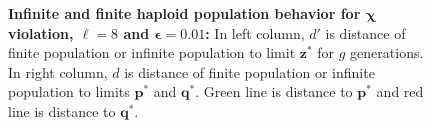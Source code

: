 \begin{figure}[ht]
\begin{center}
\hspace{-3em}%
\vspace{-0.5em} \hspace{-3em}%


\caption[\textbf{Infinite and finite haploid population behavior for $\bm{\chi}$ violation, $\ell = 8$ and $\bm{\epsilon} = 0.01$}]
{\textbf{Infinite and finite haploid population behavior for $\bm{\chi}$ violation, $\ell = 8$ and $\bm{\epsilon} = 0.01$:} 
  In left column, $d'$ is distance of finite population or infinite population to limit $\bm{z}^\ast$ for $g$ generations. 
  In right column, $d$ is distance of finite population or infinite population to limits $\bm{p}^\ast$ and $\bm{q}^\ast$. Green line is distance to $\bm{p}^\ast$ and red line is distance to $\bm{q}^\ast$.}
\label{oscillation_8h_vio_chi_0.01}
\end{center}
\end{figure}


